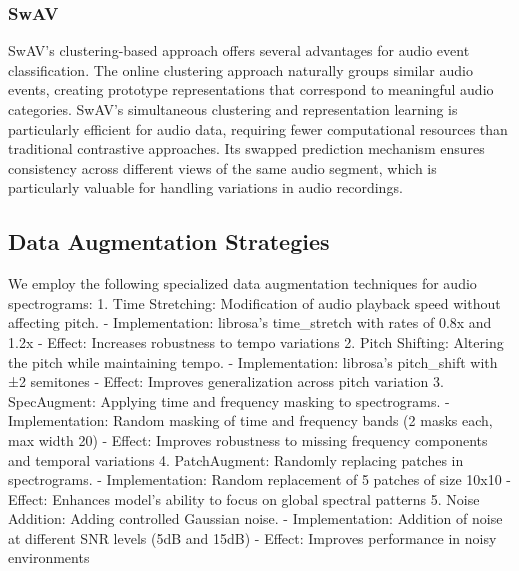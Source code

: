\documentclass[11pt]{article}
\begin{document}
\subsubsection{SwAV}
SwAV's clustering-based approach offers several advantages for audio event classification. The online clustering approach naturally groups similar audio events, creating prototype representations that correspond to meaningful audio categories. SwAV's simultaneous clustering and representation learning is particularly efficient for audio data, requiring fewer computational resources than traditional contrastive approaches. Its swapped prediction mechanism ensures consistency across different views of the same audio segment, which is particularly valuable for handling variations in audio recordings.
\subsection{Data Augmentation Strategies}
We employ the following specialized data augmentation techniques for audio spectrograms:
1. Time Stretching: Modification of audio playback speed without affecting pitch.
   - Implementation: librosa's time\_stretch with rates of 0.8x and 1.2x
   - Effect: Increases robustness to tempo variations
2. Pitch Shifting: Altering the pitch while maintaining tempo.
   - Implementation: librosa's pitch\_shift with ±2 semitones
   - Effect: Improves generalization across pitch variation
3. SpecAugment: Applying time and frequency masking to spectrograms.
   - Implementation: Random masking of time and frequency bands (2 masks each, max width 20)
   - Effect: Improves robustness to missing frequency components and temporal variations
4. PatchAugment: Randomly replacing patches in spectrograms.
   - Implementation: Random replacement of 5 patches of size 10x10
   - Effect: Enhances model's ability to focus on global spectral patterns
5. Noise Addition: Adding controlled Gaussian noise.
   - Implementation: Addition of noise at different SNR levels (5dB and 15dB)
   - Effect: Improves performance in noisy environments
\end{document}

